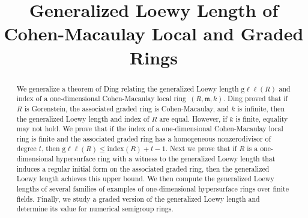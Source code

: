 \documentclass{amsart}
\theoremstyle{definition}
\theoremstyle{definition}
\numberwithin{equation}{section}
\theoremstyle{definition}
\begin{document}
 
\title[Generalized Loewy Length of Cohen-Macaulay Local and Graded Rings]{Generalized Loewy Length of Cohen-Macaulay Local and Graded Rings}
\begin{abstract}
We generalize a theorem of Ding relating the generalized Loewy length $\text{g}\ell\ell(R)$ and index of a one-dimensional Cohen-Macaulay local ring \,$(R,\mathfrak{m},k)$. Ding proved that if $R$ is Gorenstein, the associated graded ring is Cohen-Macaulay, and $k$ is infinite, then the generalized Loewy length and index of $R$ are equal. However, if $k$ is finite, equality may not hold. We prove that if the index of a one-dimensional Cohen-Macaulay local ring is finite and the associated graded ring has a homogeneous nonzerodivisor of degree $t$, then $\text{g}\ell\ell(R) \leq \text{index}(R)+t-1$. Next we prove that if $R$ is a one-dimensional hypersurface ring with a witness to the generalized Loewy length that induces a regular initial form on the associated graded ring, then the generalized Loewy length achieves this upper bound. We then compute the generalized Loewy lengths of several families of examples of one-dimensional hypersurface rings over finite fields. Finally, we study a graded version of the generalized Loewy length and determine its value for numerical semigroup rings.
\end{abstract}
\maketitle
\end{document}
